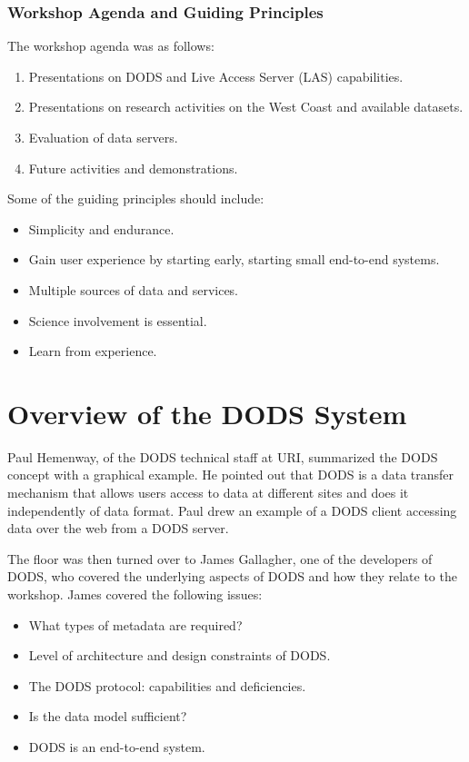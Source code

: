 \subsubsection{Workshop Agenda and Guiding Principles}

The workshop agenda was as follows:

\begin{enumerate}
\item Presentations on DODS and Live Access Server (LAS) capabilities.
\item Presentations on research activities on the West Coast and
  available datasets.
\item Evaluation of data servers.
\item Future activities and demonstrations.
\end{enumerate}

Some of the guiding principles should include:

\begin{itemize}
\item Simplicity and endurance.
\item Gain user experience by starting early, starting small end-to-end systems.
\item Multiple sources of data and services.
\item Science involvement is essential.
\item Learn from experience.
\end{itemize}

\section{Overview of the DODS System}

Paul Hemenway, of the DODS technical staff at URI, summarized the DODS
concept with a graphical example.  He pointed out that DODS is a data
transfer mechanism that allows users access to data at different sites
and does it independently of data format.  Paul drew an example of a
DODS client accessing data over the web from a DODS server.

The floor was then turned over to James Gallagher, one of the
developers of DODS, who covered the underlying aspects of DODS and how
they relate to the workshop.  James covered the following issues:

\begin{itemize}
\item What types of metadata are required?
\item Level of architecture and design constraints of DODS.
\item The DODS protocol: capabilities and deficiencies.
\item Is the data model sufficient?   
\item DODS is an end-to-end system.
\end{itemize}

